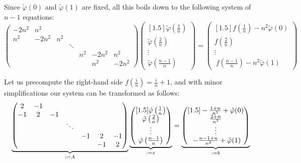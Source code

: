 \documentclass[notitlepage,oneside]{book}
\begin{document}
Since $\tilde\varphi(0)$ and $\tilde\varphi(1)$ are fixed, all this boils down to the following system of $n-1$ equations:
$$
\begin{pmatrix}
-2 n^2 &   n^2 &       &      &      &       &        \\
   n^2 & -2n^2 & n^2   &      &      &       &        \\
       &       &       &\ddots&      &       &        \\
       &       &       &      &  n^2 & -2n^2 &    n^2 \\
       &       &       &      &      &   n^2 & -2 n^2
\end{pmatrix}
\begin{pmatrix}[1.5] \tilde\varphi\left(\frac{1}{n}\right) \\ \tilde\varphi\left(\frac{2}{n}\right) \\ \vdots \\\tilde\varphi\left(\frac{n-1}{n}\right) \end{pmatrix}
=
\begin{pmatrix}[1.5] f\left(\frac{1}{n}\right) - n^2 \tilde\varphi(0) \\ f\left(\frac{2}{n}\right) \\ \vdots \\\ f\left(\frac{n-1}{n}\right) - n^2\tilde\varphi(1) \end{pmatrix}
$$

Let us precompute the right-hand side $f\left(\frac{i}{n}\right) = \frac{i}{n} + 1$, and with minor simplifications our system can be transformed as follows:
$$
\underbrace{\begin{pmatrix}
 2     & -1    &       &      &      &       &        \\
-1     &  2    &  -1   &      &      &       &        \\
       &       &       &\ddots&      &       &        \\
       &       &       &      &  -1  &  2    & -1     \\
       &       &       &      &      &  -1   &  2
\end{pmatrix}}_{:= A}
\underbrace{\begin{pmatrix}[1.5] \tilde\varphi\left(\frac{1}{n}\right) \\ \tilde\varphi\left(\frac{2}{n}\right) \\ \vdots \\\tilde\varphi\left(\frac{n-1}{n}\right) \end{pmatrix}}_{:=x}
=
\underbrace{\begin{pmatrix}[1.5] -\frac{1+n}{n^3} + \tilde\varphi(0) \\ \-\frac{2+n}{n^3} \\ \vdots \\\ -\frac{n-1+n}{n^2} +\tilde\varphi(1) \end{pmatrix}}_{:=b}
$$
\end{document}
